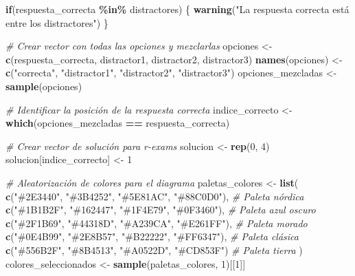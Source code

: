 \documentclass[
]{article}
\newenvironment{Shaded}{\begin{snugshade}}{\end{snugshade}}
\newcommand{\CommentTok}[1]{\textcolor[rgb]{0.56,0.35,0.01}{\textit{#1}}}
\newcommand{\ControlFlowTok}[1]{\textcolor[rgb]{0.13,0.29,0.53}{\textbf{#1}}}
\newcommand{\DecValTok}[1]{\textcolor[rgb]{0.00,0.00,0.81}{#1}}
\newcommand{\FunctionTok}[1]{\textcolor[rgb]{0.13,0.29,0.53}{\textbf{#1}}}
\newcommand{\NormalTok}[1]{#1}
\newcommand{\OtherTok}[1]{\textcolor[rgb]{0.56,0.35,0.01}{#1}}
\newcommand{\SpecialCharTok}[1]{\textcolor[rgb]{0.81,0.36,0.00}{\textbf{#1}}}
\newcommand{\StringTok}[1]{\textcolor[rgb]{0.31,0.60,0.02}{#1}}
\begin{document}
\begin{Shaded}
\begin{Highlighting}[]
\ControlFlowTok{if}\NormalTok{(respuesta\_correcta }\SpecialCharTok{\%in\%}\NormalTok{ distractores) \{}
  \FunctionTok{warning}\NormalTok{(}\StringTok{"La respuesta correcta está entre los distractores"}\NormalTok{)}
\NormalTok{\}}

\CommentTok{\# Crear vector con todas las opciones y mezclarlas}
\NormalTok{opciones }\OtherTok{\textless{}{-}} \FunctionTok{c}\NormalTok{(respuesta\_correcta, distractor1, distractor2, distractor3)}
\FunctionTok{names}\NormalTok{(opciones) }\OtherTok{\textless{}{-}} \FunctionTok{c}\NormalTok{(}\StringTok{"correcta"}\NormalTok{, }\StringTok{"distractor1"}\NormalTok{, }\StringTok{"distractor2"}\NormalTok{, }\StringTok{"distractor3"}\NormalTok{)}
\NormalTok{opciones\_mezcladas }\OtherTok{\textless{}{-}} \FunctionTok{sample}\NormalTok{(opciones)}

\CommentTok{\# Identificar la posición de la respuesta correcta}
\NormalTok{indice\_correcto }\OtherTok{\textless{}{-}} \FunctionTok{which}\NormalTok{(opciones\_mezcladas }\SpecialCharTok{==}\NormalTok{ respuesta\_correcta)}

\CommentTok{\# Crear vector de solución para r{-}exams}
\NormalTok{solucion }\OtherTok{\textless{}{-}} \FunctionTok{rep}\NormalTok{(}\DecValTok{0}\NormalTok{, }\DecValTok{4}\NormalTok{)}
\NormalTok{solucion[indice\_correcto] }\OtherTok{\textless{}{-}} \DecValTok{1}

\CommentTok{\# Aleatorización de colores para el diagrama}
\NormalTok{paletas\_colores }\OtherTok{\textless{}{-}} \FunctionTok{list}\NormalTok{(}
  \FunctionTok{c}\NormalTok{(}\StringTok{"\#2E3440"}\NormalTok{, }\StringTok{"\#3B4252"}\NormalTok{, }\StringTok{"\#5E81AC"}\NormalTok{, }\StringTok{"\#88C0D0"}\NormalTok{),  }\CommentTok{\# Paleta nórdica}
  \FunctionTok{c}\NormalTok{(}\StringTok{"\#1B1B2F"}\NormalTok{, }\StringTok{"\#162447"}\NormalTok{, }\StringTok{"\#1F4E79"}\NormalTok{, }\StringTok{"\#0F3460"}\NormalTok{),  }\CommentTok{\# Paleta azul oscuro}
  \FunctionTok{c}\NormalTok{(}\StringTok{"\#2F1B69"}\NormalTok{, }\StringTok{"\#44318D"}\NormalTok{, }\StringTok{"\#A239CA"}\NormalTok{, }\StringTok{"\#E261FF"}\NormalTok{),  }\CommentTok{\# Paleta morado}
  \FunctionTok{c}\NormalTok{(}\StringTok{"\#0E4B99"}\NormalTok{, }\StringTok{"\#2E8B57"}\NormalTok{, }\StringTok{"\#B22222"}\NormalTok{, }\StringTok{"\#FF6347"}\NormalTok{),  }\CommentTok{\# Paleta clásica}
  \FunctionTok{c}\NormalTok{(}\StringTok{"\#556B2F"}\NormalTok{, }\StringTok{"\#8B4513"}\NormalTok{, }\StringTok{"\#A0522D"}\NormalTok{, }\StringTok{"\#CD853F"}\NormalTok{)   }\CommentTok{\# Paleta tierra}
\NormalTok{)}
\NormalTok{colores\_seleccionados }\OtherTok{\textless{}{-}} \FunctionTok{sample}\NormalTok{(paletas\_colores, }\DecValTok{1}\NormalTok{)[[}\DecValTok{1}\NormalTok{]]}


\end{Highlighting}
\end{Shaded}
\end{document}
